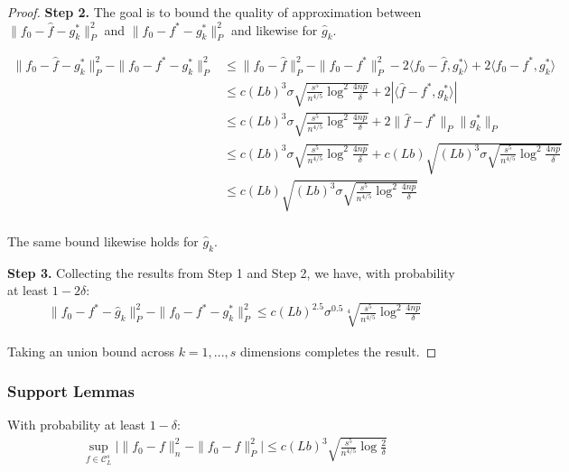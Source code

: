 \begin{proof}
\textbf{Step 2.} The goal is to bound the quality of approximation between $\| f_0 - \hat{f} - g^*_k \|_P^2$ and $\| f_0 - f^* - g^*_k \|_P^2$ and likewise for $\hat{g}_k$.

\begin{align*}
\| f_0 - \hat{f} - g^*_k \|_P^2 - \| f_0 - f^* - g^*_k\|_P^2 &\leq 
    \| f_0 - \hat{f} \|_P^2 - \|f_0 - f^*\|_P^2 - 2\langle f_0 - \hat{f}, g^*_k \rangle
   + 2 \langle f_0 - f^*, g^*_k \rangle \\
 &\leq c (Lb)^3 \sigma \sqrt{ \frac{s^5}{n^{4/5}} \log^2 \frac{4np}{\delta}} + 
    2 | \langle \hat{f} - f^*, g^*_k \rangle |  \\
 &\leq  c (Lb)^3 \sigma \sqrt{ \frac{s^5}{n^{4/5}} \log^2 \frac{4np}{\delta}} +
    2 \| \hat{f} - f^* \|_P \| g^*_k \|_P \\
&\leq  c (Lb)^3 \sigma \sqrt{ \frac{s^5}{n^{4/5}} \log^2 \frac{4np}{\delta}} +
   c (Lb) \sqrt{(Lb)^3\sigma \sqrt{ 
                   \frac{s^5}{n^{4/5}} \log^2 \frac{4np}{\delta}} }\\
&\leq  c (Lb) \sqrt{(Lb)^3\sigma \sqrt{ 
                   \frac{s^5}{n^{4/5}} \log^2 \frac{4np}{\delta}} }\\
\end{align*}

The same bound likewise holds for $\hat{g}_k$.

\textbf{Step 3.} Collecting the results from Step 1 and Step 2, we have, with probability at least $1-2\delta$:
\begin{align*}
\| f_0 - f^* - \hat{g}_k \|_P^2 - \|f_0 - f^* - g^*_k \|_P^2 \leq
   c (Lb)^{2.5} \sigma^{0.5} 
     \sqrt[4]{ \frac{s^5}{n^{4/5}} \log^2 \frac{4np}{\delta}} 
\end{align*}

Taking an union bound across $k=1,...,s$ dimensions completes the result.

\end{proof}








\subsubsection{Support Lemmas}


\begin{lemma}
\label{lem:uniform_convergence}
With probability at least $1-\delta$:
\begin{align*}
\sup_{f \in \mathcal{C}^s_L} \Big| \| f_0 - f \|^2_n - \|f_0 - f \|^2_P\Big| \leq
   c (Lb)^3 \sqrt{ \frac{s^5}{n^{4/5}} \log \frac{2}{\delta}}
\end{align*}

\end{lemma}

